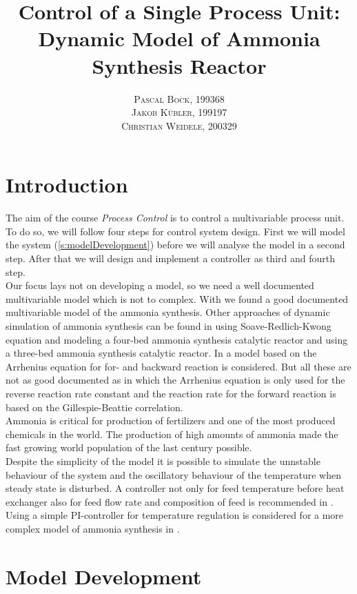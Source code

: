 \documentclass[paper=letter, fontsize=12pt]{article}
\title{\vspace{-15mm}\fontsize{24pt}{10pt}\selectfont\textbf{Control of a Single Process Unit: Dynamic Model of Ammonia Synthesis Reactor}} %
\author{
\large
{\textsc{Pascal Bock, 199368 }}\\[2mm]
{\textsc{Jakob Kübler, 199197 }}\\[2mm]
{\textsc{Christian Weidele, 200329 }}\\[2mm]
}
\date{}
\begin{document}
\maketitle %
\thispagestyle{fancy} %


\section{Introduction}
The aim of the course \emph{Process Control} is to control a multivariable process unit. To do so, we will follow four steps for control system design. First we will model the system (\autoref{s:modelDevelopment}) before we will analyse the model in a second step. After that we will design and implement a controller as third and fourth step. \\
Our focus lays not on developing a model, so we need a well documented multivariable model which is not to complex. With \cite{Jinasena2016} we found a good documented multivariable model of the ammonia synthesis. Other approaches of dynamic simulation of ammonia synthesis can be found in \cite{Kasiri2003} using Soave-Redlich-Kwong equation and modeling a four-bed ammonia synthesis catalytic reactor and \cite{Mancusi2009} using a three-bed ammonia synthesis catalytic reactor. In \cite{Morud1998} a model based on the Arrhenius equation for for- and backward reaction is considered. But all these are not as good documented as \cite{Jinasena2016} in which the Arrhenius equation is only used for the reverse reaction rate constant and the reaction rate for the forward reaction is based on the Gillespie-Beattie correlation.\\
Ammonia is critical for production of fertilizers and one of the most produced chemicals in the world. The production of high amounts of ammonia made the fast growing world population of the last century possible. \cite{Pattabathula2016} \\
Despite the simplicity of the model it is possible to simulate the unnstable behaviour of the system and the oscillatory behaviour of the temperature when steady state is disturbed. A controller not only for feed temperature before heat exchanger also for feed flow rate and composition of feed is recommended in \cite{Jinasena2016}. Using a simple PI-controller for temperature regulation is considered for a more complex model of ammonia synthesis in \cite{Morud1998}.


\section{Model Development} \label{s:modelDevelopment}
\end{document}
